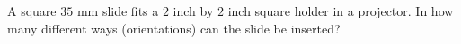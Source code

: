 A square $35$ mm slide fits a $2$ inch by $2$ inch square holder in a projector. In how many different ways (orientations) can the slide be inserted?
